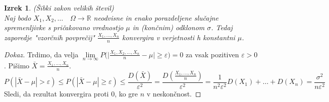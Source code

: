 \documentclass[11pt]{article}
\newtheorem{Izrek}{{\sc Izrek}}[section]
\newenvironment{dokaz}[1][{\sc Dokaz}]{\begin{proof}[#1]\renewcommand*{\qedsymbol}{\(\blacksquare\)}}{\end{proof}}
\begin{document}
	\begin{Izrek}
	(Šibki zakon velikih števil)
	\\
	Naj bodo $X_1, X_2, \ldots \quad \Omega \to \mathbb{R}$ neodvisne in enako porazdeljene slučajne spremenljivke s pričakovano vrednostjo $\mu$ in (končnim) odklonom $\sigma$. Tedaj zaporedje "vzorčnih povprečij" $\frac{X_1,\ldots , X_n}{n}$ konvergira v verjetnosti h konstantni $\mu$.
	\end{Izrek}
	\begin{dokaz}
		Trdimo, da velja $\lim\limits_{n \to \infty}{P(|\frac{X_1,X_2,\ldots , X_n}{n}} - \mu| \ge \varepsilon) = 0$ za vsak pozitiven $\varepsilon > 0$. Pišimo $\bar{X} = \frac{X_1,\ldots , X_n}{n}$.
		$$P(|\bar{X} - \mu | > \varepsilon) \le P(|\bar{X} - \mu | \ge \varepsilon) \le \frac{D(\bar{X})}{\varepsilon ^2} = \frac{D(\frac{X_1,\ldots , X_n}{n})}{\varepsilon ^2} = \frac{1}{n^2 \varepsilon ^2}D(X_1) + \ldots + D(X_n) = \frac{\sigma ^2 }{n \varepsilon ^2}$$
		Sledi, da rezultat konvergira proti $0$, ko gre $n$ v neskončnost.
	\end{dokaz}
	
\end{document}
